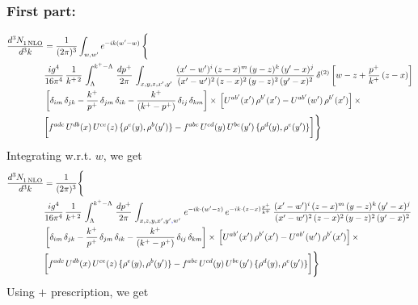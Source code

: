\documentclass[9pt]{article}
\numberwithin{equation}{section}
\begin{document}
\subsubsection{First part:}
\begin{align}
    \frac{d^{3}N_{1\,\rm NLO}^{\rm}}{d^{3}k}  & = \frac{1}{(2\pi)^{3}}  \int_{w, w^\prime} e^{-ik(w^\prime-w)}\, \Bigg\{\notag \\ & \frac{ig^{4}}{16\pi^{4}}\, \frac{1}{k^{+\,2}}\,\int_{\Lambda}^{k^{+}-\Lambda}\, \frac{dp^{+}}{2\pi}\,\int_{x,y,z,x',y'}\,\frac{(x'-w')^{i}\,(z-x)^{m}\,(y-z)^{k}\,(y'-x)^{j}}{(x'-w')^{2}\,(z-x)^{2}\,(y-z)^{2}\,(y'-x)^{2}}\, \delta^{(2)}\left[w-z+\frac{p^{+}}{k^{+}}\,(z-x)\right]\notag \\ & \left[\delta_{im}\,\delta_{jk}-\frac{k^{+}}{p^{+}}\, \delta_{jm}\,\delta_{ik}-\frac{k^{+}}{(k^{+}-p^{+})}\, \delta_{ij}\,\delta_{km}\right]\times\, \left[U^{ab'}(x')\,\rho^{b'}(x')-U^{ab'}(w')\,\rho^{b'}(x')\right]\times\notag \\ & \bigg[f^{adc}\,U^{db}(x)\,U^{ce}(z)\, \{\rho^{e}(y),\rho^{b}(y')\}-f^{abc}\,U^{cd}(y)\,U^{be}(y')\, \{\rho^{d}(y),\rho^{e}(y')\}\bigg]\Bigg\}
\end{align}
Integrating w.r.t. $w$, we get
\begin{align}
     \frac{d^{3}N_{1\,\rm NLO}^{\rm}}{d^{3}k}  & = \frac{1}{(2\pi)^{3}} \Bigg\{\notag \\ &  \frac{ig^{4}}{16\pi^{4}}\, \frac{1}{k^{+\,2}}\,\int_{\Lambda}^{k^{+}-\Lambda}\, \frac{dp^{+}}{2\pi}\,\int_{x,z,y,x',y'{\color{blue},}w'}\,e^{-ik\cdot (w^\prime-z)}\,e^{-ik\cdot (z-x)\frac{p^{+}}{k^{+}}}\,\frac{(x'-w')^{i}\,(z-x)^{m}\,(y-z)^{k}\,(y'-x)^{j}}{(x'-w')^{2}\,(z-x)^{2}\,(y-z)^{2}\,(y'-x)^{2}}\,\notag \\ & \left[\delta_{im}\,\delta_{jk}-\frac{k^{+}}{p^{+}}\, \delta_{jm}\,\delta_{ik}-\frac{k^{+}}{(k^{+}-p^{+})}\, \delta_{ij}\,\delta_{km}\right]\times\, \left[U^{ab'}(x')\,\rho^{b'}(x')-U^{ab'}(w')\,\rho^{b'}(x')\right]\times\notag \\ & \bigg[f^{adc}\,U^{db}(x)\,U^{ce}(z)\, \{\rho^{e}(y),\rho^{b}(y')\}-f^{abc}\,U^{cd}(y)\,U^{be}(y')\, \{\rho^{d}(y),\rho^{e}(y')\}\bigg]\Bigg\}
\end{align}
Using $+$ prescription, we get
\end{document}

